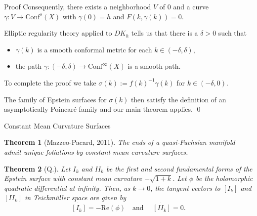 \documentclass[professionalfont]{beamer}
\newtheorem*{thm*}{Theorem}
\newcommand{\two}{I\!I}
\begin{document}

\begin{frame}{Proof}
Consequently, there exists a neighborhood $V$ of $0$ and a curve $\gamma : V \to \mathrm{Conf}^s(X)$ with $\gamma(0) = h$ and $F(k, \gamma(k)) = 0$. 
\newline \pause

Elliptic regularity theory applied to $D K_h$ tells us that there is a $\delta >0$ such that 

\begin{itemize}

	\item $\gamma(k)$ is a smooth conformal metric for each $k \in (-\delta,\delta)$, \pause
	
	\item the path $\gamma: (-\delta,\delta) \to \mathrm{Conf}^\infty(X)$ is a smooth path. \pause
	
\end{itemize}
\vspace{0.5cm}

To complete the proof we take $\sigma(k) := f(k)^{-1}\gamma(k)$ for $k \in (-\delta,0)$.
\newline

The family of Epstein surfaces for $\sigma(k)$ then satisfy the definition of an asymptotically Poincar\'e family and our main theorem applies.  \qed
\end{frame}




\begin{frame}{Constant Mean Curvature Surfaces}

\begin{thm*}[Mazzeo-Pacard, 2011]
The ends of a quasi-Fuchsian manifold admit unique foliations by constant mean curvature surfaces. 
\end{thm*}
\vspace{0.5cm}

\begin{thm*}[Q.]
Let $I_k$ and $\two_k$ be the first and second fundamental forms of the Epstein surface with constant mean curvature $-\sqrt{1+k}$.
Let $\phi$ be the holomorphic quadratic differential at infinity. 
Then, as $k \to 0$, the tangent vectors to $[I_k]$ and $[\two_k]$ in Teichm\"uller space are given by 
\[
  \dot{[I_k]}= - \mathrm{Re}(\phi) \quad \text{and } \quad \dot{[\two_k]} = 0.
\]
\end{thm*}

\end{frame}
\end{document}
